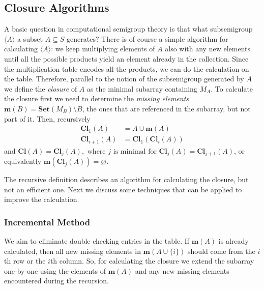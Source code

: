 \documentclass{amsart}
\newcommand{\Set}{\mathbf{Set}}
\newcommand{\Miss}{\mathbf{m}}
\newcommand{\Closure}{\mathbf{Cl}}
\theoremstyle{plain}
\theoremstyle{definition}
\begin{document}
\subsection{Closure Algorithms}
A basic question in computational semigroup theory is that what subsemigroup $\langle A\rangle$ a subset $A\subseteq S$ generates?
There is of course a simple algorithm for calculating $\langle A\rangle$: we keep multiplying elements of $A$ also with any new elements until all the possible products yield an element already in the collection.
Since the multiplication table encodes all the products, we can do the calculation on the table. 
Therefore, parallel to the notion of the subsemigroup generated by $A$ we define the \emph{closure} of $A$ as the minimal subarray containing $M_A$.
To calculate the closure first we need to determine the \emph{missing elements} $\Miss(B)=\Set(M_B)\setminus B$, the ones that are referenced in the subarray, but not part of it.
Then, recursively
\begin{align*}
\Closure_1(A)&=A\cup\Miss(A)\\
\Closure_{i+1}(A)&=\Closure_1(\Closure_{i}(A))
\end{align*}
and
$ \Closure(A)=\Closure_j(A), \text{ where $j$ is minimal for }\Closure_j(A)=\Closure_{j+1}(A)$, or equivalently $\Miss(\Closure_j(A))=\varnothing$.

The recursive definition describes an algorithm for calculating the closure, but not an efficient one. Next we discuss some techniques that can be applied to improve the calculation.

\subsubsection{Incremental Method}
We aim to eliminate double checking entries in the table.
If $\Miss(A)$ is already calculated, then all new missing elements in $\Miss(A\cup\{i\})$ should come from the $i$th row or the $i$th column.
So, for calculating the closure we extend the subarray one-by-one using the elements of $\Miss(A)$ and any new missing elements encountered during the recursion.
\end{document}
